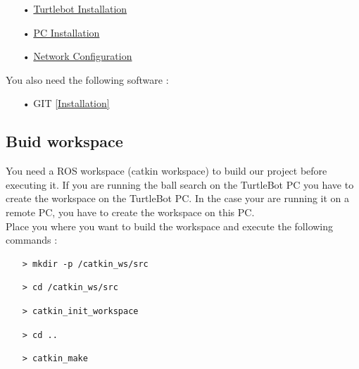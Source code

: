 \documentclass[10pt,a4paper]{article}
\begin{document}
\begin{itemize}
\item[•] \href{http://wiki.ros.org/turtlebot/Tutorials/indigo/Turtlebot%20Installation}{Turtlebot Installation} 
\item[•] \href{http://wiki.ros.org/turtlebot/Tutorials/indigo/PC%20Installation}{PC Installation} 
\item[•] \href{http://wiki.ros.org/turtlebot/Tutorials/indigo/Network%20Configuration}{Network Configuration} 
\end{itemize}


You also need the following software :

\begin{itemize}
\item[•] GIT \href{https://git-scm.com/download/linux}{[Installation]} 
\end{itemize}

\subsection{Buid workspace}

You need a ROS workspace (catkin workspace) to build our project before executing it. If you are running the ball search on the TurtleBot PC you have to create the workspace on the TurtleBot PC. In the case your are running it on a remote PC, you have to create the workspace on this PC.\\

Place you where you want to build the workspace and execute the following commands :

\begin{itemize}
\item[]  \begin{verbatim}> mkdir -p /catkin_ws/src \end{verbatim}
\item[]  \begin{verbatim}> cd /catkin_ws/src \end{verbatim}
\item[]  \begin{verbatim}> catkin_init_workspace \end{verbatim}
\item[]  \begin{verbatim}> cd .. \end{verbatim}
\item[]  \begin{verbatim}> catkin_make \end{verbatim}
\end{itemize}
\end{document}
